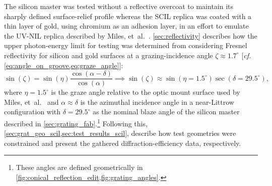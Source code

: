 The silicon master was tested without a reflective overcoat to maintain its sharply defined surface-relief profile whereas the SCIL replica was coated with a thin layer of gold, using chromium as an adhesion layer, in an effort to emulate the UV-NIL replica described by Miles, et~al.~\cite[\emph{cf.\@} \cref{sec:nanoimprint}]{Miles18}. 
\cref{sec:reflectivity} describes how the upper photon-energy limit for testing was determined from considering Fresnel reflectivity for silicon and gold surfaces at a grazing-incidence angle $\zeta \approx 1.7^{\circ}$ [\emph{cf.\@} \cref{eq:angle_on_groove,eq:graze_angle}]: 
\begin{equation}
 \sin \left( \zeta \right) = \sin \left( \eta \right) \frac{\cos \left( \alpha - \delta \right)}{\cos \left( \alpha \right)} \implies \sin \left( \zeta \right) \approx \sin \left( \eta = 1.5^{\circ} \right) \sec \left( \delta = 29.5^{\circ} \right) ,
 \end{equation}
where $\eta = 1.5^{\circ}$ is the graze angle relative to the optic mount surface used by Miles, et~al.~\cite{Miles18} and $\alpha \approx \delta$ is the azimuthal incidence angle in a near-Littrow configuration with $\delta = 29.5^{\circ}$ as the nominal blaze angle of the silicon master described in \cref{sec:grating_fab}.\footnote{These angles are defined geometrically in \cref{fig:conical_reflection_edit,fig:grating_angles}.}
Following this, \cref{sec:grat_geo_scil,sec:test_results_scil}, describe how test geometries were constrained and present the gathered diffraction-efficiency data, respectively.  

